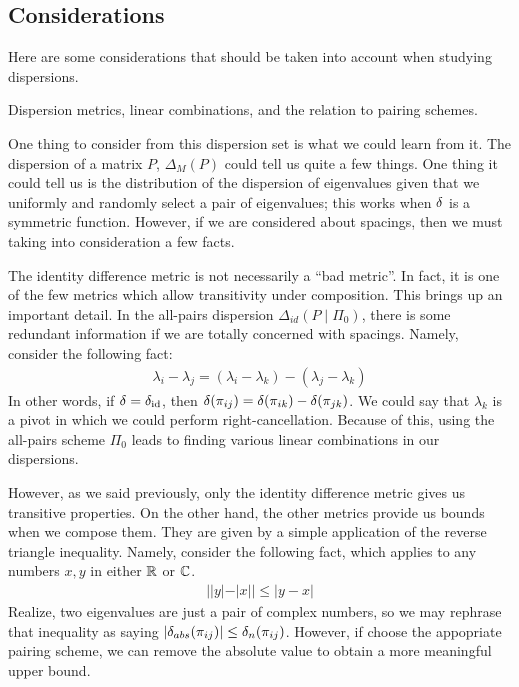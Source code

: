 \subsection{Considerations}

Here are some considerations that should be taken into account when studying dispersions.

Dispersion metrics, linear combinations, and the relation to pairing schemes.


One thing to consider from this dispersion set is what we could learn from it.
The dispersion of a matrix $P$, $\Delta_M(P)$ could tell us quite a few things.
One thing it could tell us is the distribution of the dispersion of eigenvalues given that we uniformly and randomly select a pair of eigenvalues;
this works when $\delta$ is a symmetric function. However, if we are considered about spacings, then we must taking into consideration a few facts.
\newline
\medskip

 The identity difference metric is not necessarily a ``bad metric''.
In fact, it is one of the few metrics which allow transitivity under composition.
This brings up an important detail.
In the all-pairs dispersion $\Delta_{id}(P \mid \Pi_0)$, there is some redundant information if we are totally concerned with spacings. Namely, consider the following fact:
\begin{align*}
\lambda_i - \lambda_j = (\lambda_i - \lambda_k) - (\lambda_j - \lambda_k)
\end{align*}
In other words, if $\delta = \delta_{\text{id}}$, then $\delta(\pi_{ij}) = \delta(\pi_{ik}) - \delta(\pi_{jk})$.
We could say that $\lambda_k$ is a pivot in which we could perform right-cancellation.
Because of this, using the all-pairs scheme $\Pi_0$ leads to finding various linear combinations in our dispersions.
\newline
\medskip

 However, as we said previously, only the identity difference metric gives us transitive properties.
On the other hand, the other metrics provide us bounds when we compose them.
They are given by a simple application of the reverse triangle inequality. Namely, consider the following fact, which applies to any numbers $x, y$ in either $\mathbb{R}$ or $\mathbb{C}$.
\begin{align*}
||y| - |x|| \leq |y - x|
\end{align*}
Realize, two eigenvalues are just a pair of complex numbers, so we may rephrase that inequality as saying $|\delta_{abs}(\pi_{ij})| \leq \delta_{n}(\pi_{ij})$.
However, if choose the appopriate pairing scheme, we can remove the absolute value to obtain a more meaningful upper bound. \newline

